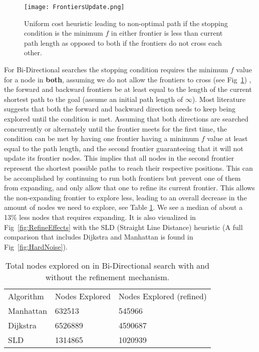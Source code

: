 \documentclass[conference]{IEEEtran}
\begin{document}
\begin{figure}[H]
    \centering
    \texttt{[image: FrontiersUpdate.png]}
    \caption{Uniform cost heuristic leading to non-optimal path if the stopping condition is the minimum $f$ in either frontier is less than current path length as opposed to both if the frontiers do not cross each other.}    
    \label{fig:NoCross}
\end{figure}
For Bi-Directional searches the stopping condition requires the minimum $f$ value for a node in \textbf{both}, assuming we do not allow the frontiers to cross (see Fig~\ref{fig:NoCross}) , the forward and backward frontiers be at least equal to the length of the current shortest path to the goal (assume an initial path length of $\infty$). Most literature suggests that both the forward and backward direction needs to keep being explored until the condition is met. Assuming that both directions are searched concurrently or alternately until the frontier meets for the first time, the condition can be met by having one frontier having a minimum $f$ value at least equal to the path length, and the second frontier guaranteeing that it will not update its frontier nodes. This implies that all nodes in the second frontier represent the shortest possible paths to reach their respective positions. This can be accomplished by continuing to run both frontiers but prevent one of them from expanding, and only allow that one to refine its current frontier. This allows the non-expanding frontier to explore less, leading to an overall decrease in the amount of nodes we need to explore, see Table \ref{tab:Refinement}. We see a median of about a 13\% less nodes that requires expanding. It is also visualized in Fig~\ref{fig:RefineEffects} with the SLD (Straight Line Distance) heuristic (A full comparison that includes Dijkstra and Manhattan is found in Fig~\ref{fig:HardNoise}).

\begin{table}[H]
\begin{tabular}{lll}
Algorithm       & Nodes Explored & Nodes Explored (refined)     \\
Manhattan       & 632513       & 545966  \\
Dijkstra        & 6526889       & 4590687 \\
SLD             & 1314865       &  1020939

\end{tabular}
\caption{Total nodes explored on in Bi-Directional search with and without the refinement mechanism.}
\label{tab:Refinement}
\end{table}
\end{document}
